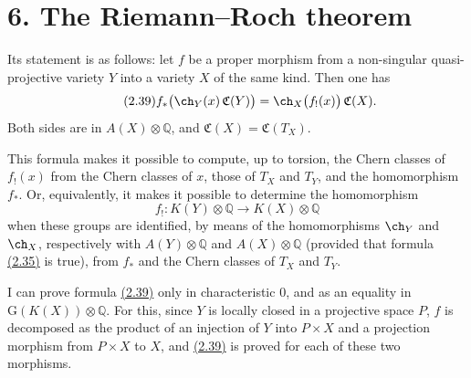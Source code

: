 \providecommand{\cS}{\mathcal S}
\providecommand{\cD}{\mathcal D}
\providecommand{\cE}{\mathscr E}
\providecommand{\cG}{\mathscr G}
\providecommand{\cL}{\mathscr L}
\providecommand{\cM}{\mathscr M}
\providecommand{\cP}{\mathscr P}
\providecommand{\cK}{\mathcal K}
\providecommand{\Db}{\mathrm D}
\providecommand{\Kb}{\mathrm K}
\providecommand{\Trc}{\operatorname{Tr}}
\providecommand{\ob}{\operatorname{ob}}
\providecommand{\Coh}{\operatorname{Coh}}
\providecommand{\Cone}{\operatorname{Cone}}
\providecommand{\im}{\operatorname{Im}}
\providecommand{\Id}{\operatorname{Id}}
\providecommand{\RR}{\mathrm{R.R.}}
\providecommand{\RRR}{\mathrm{R.R.R.}}
\providecommand{\GrR}{\mathrm{G}}
\providecommand{\pr}{\operatorname{pr}}


\section*{6. The Riemann--Roch theorem}

Its statement is as follows: let \(f\) be a proper morphism from a non-singular quasi-projective variety \(Y\) into a variety \(X\) of the same kind. Then one has
\begin{equation}\tag{2.39}
 f_*\bigl(\ch_Y(x)\,\mathfrak C(Y)\bigr)
 =
 \ch_X\bigl(f_!(x)\bigr)\,\mathfrak C(X).
\end{equation}
Both sides are in \(A(X)\otimes \mathbb Q\), and \(\mathfrak C(X)=\mathfrak C(T_X)\).

This formula makes it possible to compute, up to torsion, the Chern classes of \(f_!(x)\) from the Chern classes of \(x\), those of \(T_X\) and \(T_Y\), and the homomorphism \(f_*\). Or, equivalently, it makes it possible to determine the homomorphism
\[
  f_!:K(Y)\otimes \mathbb Q \longrightarrow K(X)\otimes \mathbb Q
\]
when these groups are identified, by means of the homomorphisms \(\ch_Y\) and \(\ch_X\), respectively with \(A(Y)\otimes \mathbb Q\) and \(A(X)\otimes \mathbb Q\) (provided that formula \hyperlink{sga6.e00.eq.2-35}{(2.35)} is true), from \(f_*\) and the Chern classes of \(T_X\) and \(T_Y\).

I can prove formula \hyperlink{sga6.e00.eq.2-39}{(2.39)} only in characteristic \(0\), and as an equality in \(\GrR(K(X))\otimes\mathbb Q\). For this, since \(Y\) is locally closed in a projective space \(P\), \(f\) is decomposed as the product of an injection of \(Y\) into \(P\times X\) and a projection morphism from \(P\times X\) to \(X\), and \hyperlink{sga6.e00.eq.2-39}{(2.39)} is proved for each of these two morphisms.

